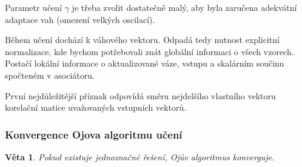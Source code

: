 \documentclass[11pt]{report} %
\newtheorem{theorem}{Věta}[section]
\numberwithin{equation}{section}
\begin{document}
Parametr učení $\gamma$ je třeba zvolit dostatečně malý, aby byla zaručena adekvátní adaptace vah (omezení velkých oscilací).

Během učení dochází k  váhového vektoru. Odpadá tedy nutnost explicitní normalizace, kde bychom potřebovali znát globální informaci o všech vzorech. Postačí lokální informace o aktualizované váze, vstupu a skalárním součinu spočteném v asociátoru.

První nejdůležitější příznak odpovídá směru nejdelšího vlastního vektoru korelační matice uvažovaných vstupních vektorů.


\subsubsection{Konvergence Ojova algoritmu učení}
\begin{theorem}
Pokud existuje jednoznačné řešení, Ojův algoritmus konverguje.
\end{theorem}
\end{document}
